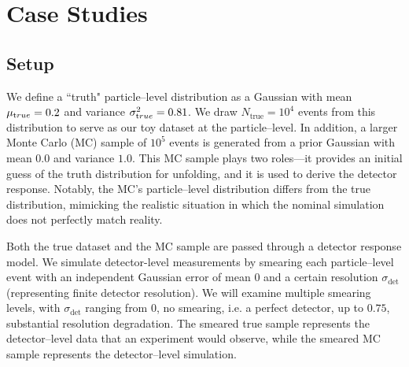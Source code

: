 \section{Case Studies}
\label{sec:case-studies}
    \subsection{Setup}
    \label{subsec:setup}
        We define a ``truth" particle--level distribution as a Gaussian with mean $\mu_{\text true}=0.2$ and variance $\sigma^2_{\text true}=0.81$.
        We draw $N_{\text{true}}=10^4$ events from this distribution to serve as our toy dataset at the particle--level.
        In addition, a larger Monte Carlo (MC) sample of $10^5$ events is generated from a prior Gaussian with mean \(0.0\) and variance \(1.0.\)
        This MC sample plays two roles---it provides an initial guess of the truth distribution for unfolding, and it is used to derive the detector response.
        Notably, the MC’s particle--level distribution differs from the true distribution, mimicking the realistic situation in which the nominal simulation does not perfectly match reality.

        Both the true dataset and the MC sample are passed through a detector response model.
        We simulate detector-level measurements by smearing each particle--level event with an independent Gaussian error of mean 0 and a certain resolution $\sigma_{\text{det}}$ (representing finite detector resolution).
        We will examine multiple smearing levels, with $\sigma_{\text{det}}$ ranging from \(0\), no smearing, i.e. a perfect detector, up to \(0.75\), substantial resolution degradation.
        The smeared true sample represents the detector--level data that an experiment would observe, while the smeared MC sample represents the detector--level simulation.
